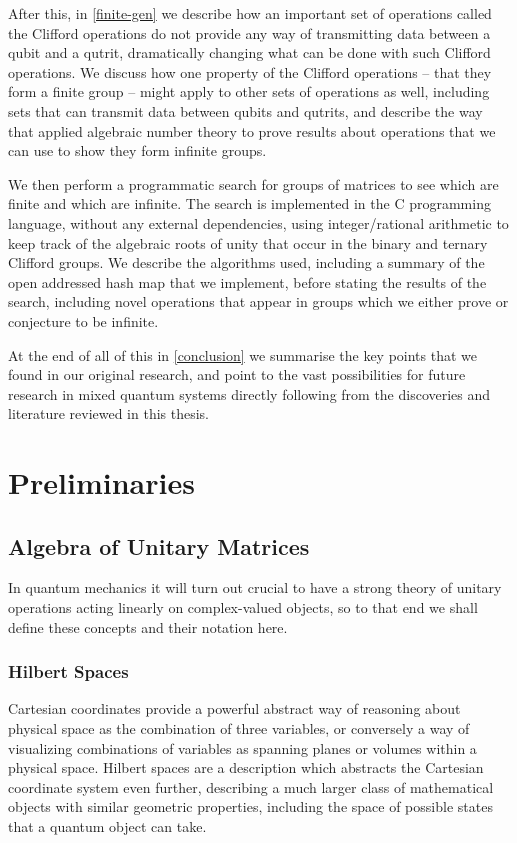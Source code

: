 After this, in \autoref{finite-gen} we describe how an important set of operations called the Clifford operations do not provide any way of transmitting data between a qubit and a qutrit, dramatically changing what can be done with such Clifford operations. We discuss how one property of the Clifford operations -- that they form a finite group -- might apply to other sets of operations as well, including sets that can transmit data between qubits and qutrits, and describe the way that \cite{universal-qubit} applied algebraic number theory to prove results about operations that we can use to show they form infinite groups.

We then perform a programmatic search for groups of matrices to see which are finite and which are infinite. The search is implemented in the C programming language, without any external dependencies, using integer/rational arithmetic to keep track of the algebraic roots of unity that occur in the binary and ternary Clifford groups. We describe the algorithms used, including a summary of the open addressed hash map that we implement, before stating the results of the search, including novel operations that appear in groups which we either prove or conjecture to be infinite.

At the end of all of this in \autoref{conclusion} we summarise the key points that we found in our original research, and point to the vast possibilities for future research in mixed quantum systems directly following from the discoveries and literature reviewed in this thesis.

\chapter[PRELIMINARIES]{Preliminaries}\label{preliminaries}
\section{Algebra of Unitary Matrices}
In quantum mechanics it will turn out crucial to have a strong theory of unitary operations acting linearly on complex-valued objects, so to that end we shall define these concepts and their notation here.
\subsection{Hilbert Spaces}\label{hilbert-space}
Cartesian coordinates provide a powerful abstract way of reasoning about physical space as the combination of three variables, or conversely a way of visualizing combinations of variables as spanning planes or volumes within a physical space. Hilbert spaces are a description which abstracts the Cartesian coordinate system even further, describing a much larger class of mathematical objects with similar geometric properties, including the space of possible states that a quantum object can take.

